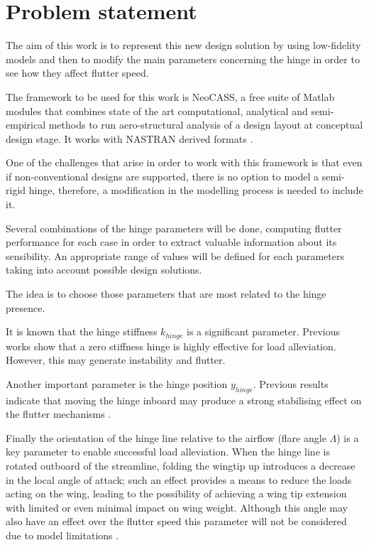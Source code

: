 \documentclass[conference]{IEEEtran}
\begin{document}
\section{Problem statement}
\label{sec:problem-statement}

The aim of this work is to represent this new design solution by using low-fidelity models and then to modify the main parameters concerning the hinge in order to see how they affect flutter speed.

The framework to be used for this work is NeoCASS, a free suite of Matlab modules that combines state of the art computational, analytical and semi-empirical methods to run aero-structural analysis of a design layout at conceptual design stage. It works with NASTRAN derived formats \cite{cavagna2011neocass}.

One of the challenges that arise in order to work with this framework is that even if non-conventional designs are supported, there is no option to model a semi-rigid hinge, therefore, a modification in the modelling process is needed to include it.

Several combinations of the hinge parameters will be done, computing flutter performance for each case in order to extract valuable information about its sensibility. An appropriate range of values will be defined for each parameters taking into account possible design solutions.

The idea is to choose those parameters that are most related to the hinge presence.

It is known that the hinge stiffness $k_{hinge}$ is a significant parameter. Previous works \cite{Wilson2014,Castrichini2016}show that a zero stiffness hinge is highly effective for load alleviation. However, this may generate instability and flutter.

Another important parameter is the hinge position $y_{hinge}$. Previous results indicate that moving the hinge inboard may produce a strong stabilising effect on the flutter mechanisms \cite{Wilson2014}.

Finally the orientation of the hinge line relative to the airflow (flare angle $\Lambda$) is a key parameter to enable successful load alleviation. When the hinge line is rotated outboard of the streamline, folding the wingtip up introduces a decrease in the local angle of attack; such an effect provides a means to reduce the loads acting on the wing, leading to the possibility of achieving a wing tip extension with limited or even minimal impact on wing weight. Although this angle may also have an effect over the flutter speed this parameter will not be considered due to model limitations \cite{Castrichini2020,Wilson2014}.
\end{document}
